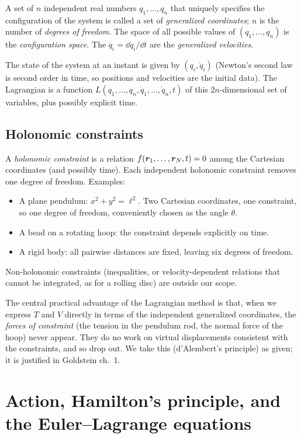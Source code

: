 \documentclass[11pt]{article}
\begin{document}
\begin{definition}
A set of $n$ independent real numbers $q_1,\dots,q_n$ that uniquely specifies the configuration of the system is called a set of \emph{generalized coordinates}; $n$ is the number of \emph{degrees of freedom}. The space of all possible values of $(q_1,\dots,q_n)$ is the \emph{configuration space}. The $\dot q_i=\dd q_i/\dd t$ are the \emph{generalized velocities}.
\end{definition}

The state of the system at an instant is given by $(q_i,\dot q_i)$ (Newton's second law is second order in time, so positions and velocities are the initial data). The Lagrangian is a function $L(q_1,\dots,q_n,\dot q_1,\dots,\dot q_n,t)$ of this $2n$-dimensional set of variables, plus possibly explicit time.

\subsection{Holonomic constraints}

A \emph{holonomic constraint} is a relation $f(\bm{r}_1,\dots,\bm{r}_N,t)=0$ among the Cartesian coordinates (and possibly time). Each independent holonomic constraint removes one degree of freedom. Examples:
\begin{itemize}[nosep]
  \item A plane pendulum: $x^2+y^2=\ell^2$. Two Cartesian coordinates, one constraint, so one degree of freedom, conveniently chosen as the angle $\theta$.
  \item A bead on a rotating hoop: the constraint depends explicitly on time.
  \item A rigid body: all pairwise distances are fixed, leaving six degrees of freedom.
\end{itemize}
Non-holonomic constraints (inequalities, or velocity-dependent relations that cannot be integrated, as for a rolling disc) are outside our scope.

The central practical advantage of the Lagrangian method is that, when we express $T$ and $V$ directly in terms of the independent generalized coordinates, the \emph{forces of constraint} (the tension in the pendulum rod, the normal force of the hoop) never appear. They do no work on virtual displacements consistent with the constraints, and so drop out. We take this (d'Alembert's principle) as given; it is justified in Goldstein ch.~1.

\section{Action, Hamilton's principle, and the Euler--Lagrange equations}
\end{document}
